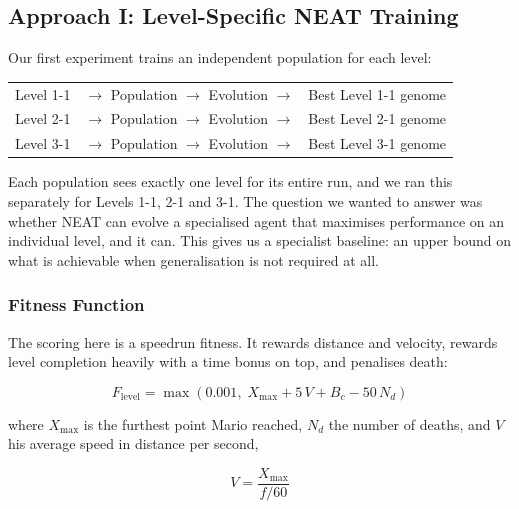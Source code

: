 \subsection{Approach I: Level-Specific NEAT Training}
\label{subsec:approach-specific}

Our first experiment trains an independent population for each level:

\begin{center}
\begin{tabular}{@{}lcl@{}}
Level 1-1 & $\rightarrow$ Population $\rightarrow$ Evolution $\rightarrow$ & Best Level 1-1 genome \\
Level 2-1 & $\rightarrow$ Population $\rightarrow$ Evolution $\rightarrow$ & Best Level 2-1 genome \\
Level 3-1 & $\rightarrow$ Population $\rightarrow$ Evolution $\rightarrow$ & Best Level 3-1 genome \\
\end{tabular}
\end{center}

\noindent
Each population sees exactly one level for its entire run, and we ran this
separately for Levels 1-1, 2-1 and 3-1. The question we wanted to answer was
whether NEAT can evolve a specialised agent that maximises performance on an
individual level, and it can. This gives us a specialist baseline: an upper
bound on what is achievable when generalisation is not required at all.

\subsubsection{Fitness Function}

The scoring here is a speedrun fitness. It rewards distance and velocity,
rewards level completion heavily with a time bonus on top, and penalises
death:

\begin{equation}
    F_{\text{level}} = \max\!\left(0.001,\;
        X_{\max} + 5\,V + B_{c} - 50\,N_{d} \right)
    \label{eq:fitness-level}
\end{equation}

\noindent
where $X_{\max}$ is the furthest point Mario reached, $N_{d}$ the number of
deaths, and $V$ his average speed in distance per second,

\begin{equation}
    V = \frac{X_{\max}}{f / 60}
    \label{eq:velocity}
\end{equation}

